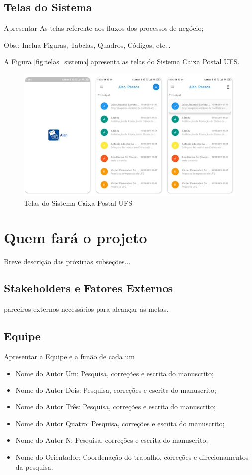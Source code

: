 \documentclass[12pt]{article}
\begin{document}
\subsection{Telas do Sistema}

Apresentar As telas referente aos fluxos dos processos de negócio;

Obs.: Inclua Figuras, Tabelas, Quadros, Códigos, etc...


A Figura \autoref{fig:telas_sistema} apresenta as telas do Sistema Caixa Postal UFS.

\begin{figure}[H]
\caption{Telas do Sistema Caixa Postal UFS}
\label{fig:telas_sistema}
\centering
\includegraphics[width=12cm]{images/telas_caixa_postal_ufs.png}
\end{figure}


\section{Quem fará o projeto}\label{sec:quem}

Breve descrição das próximas subseções...

\subsection{Stakeholders e Fatores Externos}
parceiros externos necessários para alcançar as metas.

\subsection{Equipe}
Apresentar a Equipe e a funão de cada um

\begin{itemize}
  \item Nome do Autor Um: Pesquisa, correções e escrita do manuscrito;
  \item Nome do Autor Dois: Pesquisa, correções e escrita do manuscrito;
  \item Nome do Autor Três: Pesquisa, correções e escrita do manuscrito;
  \item Nome do Autor Quatro: Pesquisa, correções e escrita do manuscrito;
  \item Nome do Autor N: Pesquisa, correções e escrita do manuscrito;
  \item Nome do Orientador: Coordenação do trabalho, correções e direcionamentos da pesquisa.
\end{itemize}
\end{document}
